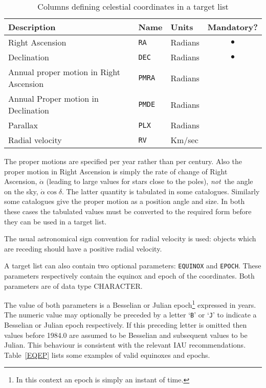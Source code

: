 \documentclass[twoside,11pt]{article}
\renewcommand{\_}{\texttt{\symbol{95}}}
\begin{document}
\begin{table}[htbp]

\begin{center}
\begin{tabular}{lllc}
Description                      & Name       & Units   & Mandatory? \\ \hline
Right Ascension                         & {\tt RA}   & Radians & $\bullet$  \\
Declination                             & {\tt DEC}  & Radians & $\bullet$  \\
Annual proper motion in Right Ascension & {\tt PMRA} & Radians & \\
Annual Proper motion in Declination     & {\tt PMDE} & Radians & \\
Parallax                                & {\tt PLX}  & Radians & \\
Radial velocity                         & {\tt RV}   & Km/sec  & \\
\end{tabular}

\caption{Columns defining celestial coordinates in a target list
\label{TARGETLIST} }
\end{center}

\end{table}

The proper motions are specified per year rather than per century.  Also
the proper motion in Right Ascension is simply the rate of change of
Right Ascension, $\dot{\alpha}$ (leading to large values for stars close
to the poles), {\it not}\, the angle on the sky, $\dot{\alpha}\cos\delta$.
The latter quantity is tabulated in some catalogues.  Similarly some
catalogues give the proper motion as a position angle and size.
In both these cases the tabulated values must be converted to the
required form before they can be used in a target list.

The usual astronomical sign convention for radial velocity is used: objects
which are receding should have a positive radial velocity.

A target list can also contain two optional parameters: {\tt EQUINOX}
and {\tt EPOCH}.  These parameters respectively contain the equinox
and epoch of the coordinates.  Both parameters are of data type
CHARACTER.

The value of both parameters is a Besselian or Julian
epoch\footnote{In this context an epoch is simply an instant of
time.} expressed in years.  The numeric value may optionally be preceded
by a letter `{\tt B}' or `{\tt J}' to indicate a Besselian or Julian
epoch respectively.  If this preceding letter is omitted then values
before 1984.0 are assumed to be Besselian and subsequent values to be
Julian.  This behaviour is consistent with the relevant IAU
recommendations.  Table~\ref{EQEP} lists some examples of valid
equinoxes and epochs.
\end{document}
